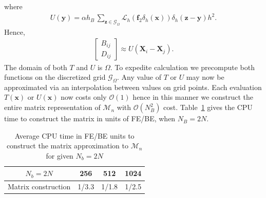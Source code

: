 \documentclass[preprint,12pt]{elsarticle}
\begin{document}
where 
\begin{align}
U(\mathbf{y}) =  \alpha h_B \, \sum_{\mathbf{z} \in \mathcal{G}_\Omega} \mathcal{L}_h  \left( \mathbf{f}_2 \delta_h (\mathbf{x}) \right) \delta_h\left(\mathbf{z}-\mathbf{y}\right)h^2.
\end{align}
Hence,
\begin{align}
\begin{bmatrix} B_{ij} \\ D_{ij} \end{bmatrix}
\approx U(\mathbf{X}_i-\mathbf{X}_j).
\end{align}
The domain of both $T$ and $U$ is $\Omega$. To expedite calculation we precompute both functions on the discretized grid $\mathcal{G}_\Omega$. Any value of $T$ or $U$ may now be approximated via an interpolation between values on grid points. Each evaluation $T(\mathbf{x})$ or $U(\mathbf{x})$ now costs only $\mathcal{O}(1)$ hence in this manner we construct the entire matrix representation of $\mathcal{M}_n$ with $\mathcal{O}(N_B^2)$ cost.
Table~\ref{Table:MConstruct} gives the CPU time to construct the matrix in units of FE/BE, when $N_B=2N$. 
\begin{table}
\begin{center}
\begin{tabular}{|c|c c c|}
\hline
$N_b=2N$ &  256  & 512 & 1024 \\
\hline
\textrm{Matrix construction} 
& 1/3.3  & 1/1.8 &  1/2.5 \\
\hline
\end{tabular}
\end{center}
\caption{Average CPU time in FE/BE units to construct the matrix approximation to $\mathcal{M}_n$ for given $N_b=2N$}
\label{Table:MConstruct}
\end{table}
\end{document}
